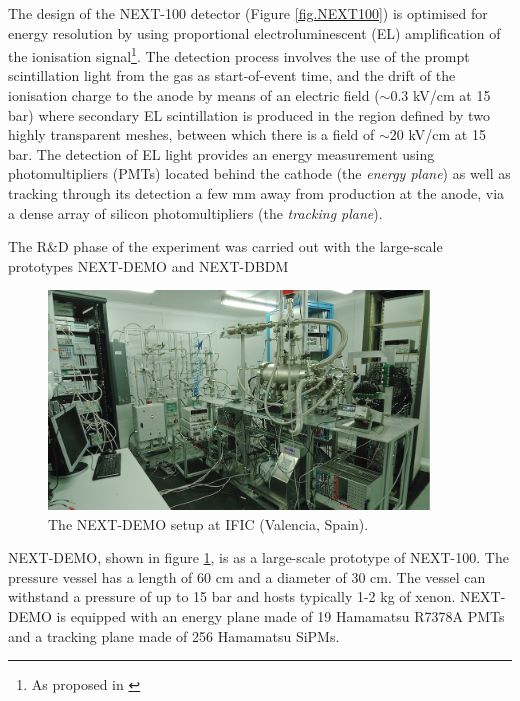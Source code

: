 \documentclass{PoS}
\begin{document}
The design of the NEXT-100 detector (Figure \ref{fig.NEXT100}) is optimised for energy resolution by using proportional electroluminescent (EL) amplification of the ionisation signal\footnote{As proposed in \cite{Nygren:2009zz}}. The detection process involves the use of the prompt scintillation light from the gas as start-of-event time, and the drift of the ionisation charge to the anode by means of an electric field ($\sim0.3$ kV/cm at 15 bar) where secondary EL scintillation is produced in the region defined by two highly transparent meshes, between which there is a field of $\sim20$ kV/cm at 15 bar. The detection of EL light provides an energy measurement using photomultipliers (PMTs) located behind the cathode (the \emph{energy plane}) as well as tracking through its detection a few mm away from production at the anode, via a dense array of silicon photomultipliers (the \emph{tracking plane}).

The R\&D phase of the experiment was carried out with the large-scale prototypes NEXT-DEMO and NEXT-DBDM

\begin{figure}
\centering
\includegraphics[width=0.9\textwidth]{img/DemoSetup.png}
\caption{\small The NEXT-DEMO setup at IFIC (Valencia, Spain).} \label{fig.DEMO}
\end{figure}
%


NEXT-DEMO, shown in figure \ref{fig.DEMO}, is as a large-scale prototype of NEXT-100. The pressure vessel has a length of 60 cm and a diameter of 30 cm. The vessel can withstand a pressure of up to 15 bar and hosts typically 1-2 kg of xenon. NEXT-DEMO is  equipped with an energy plane made of 19 Hamamatsu R7378A PMTs and a tracking plane made of 256 Hamamatsu SiPMs. 
\end{document}
